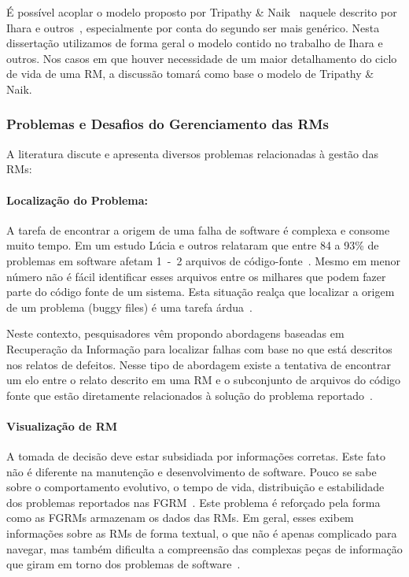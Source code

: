 É possível acoplar o modelo proposto por Tripathy \&
Naik~\cite{tripathy2014software} naquele descrito por Ihara e
outros~\cite{ihara2009analysis}, especialmente por conta do segundo ser mais
genérico.  Nesta dissertação utilizamos de forma geral o modelo contido no
trabalho de Ihara e outros. Nos casos em que houver necessidade de um maior
detalhamento do ciclo de vida de uma RM, a discussão tomará como base o modelo
de Tripathy \& Naik.
\todoend{}


\subsubsection{Problemas e Desafios do Gerenciamento das RMs}
\label{ssub:problemas_relacionadas_rm}

A literatura discute e apresenta diversos problemas relacionadas à gestão das
RMs:

\paragraph{Localização do Problema:} A tarefa de encontrar a origem de uma falha
de software é complexa e consome muito tempo. Em um estudo Lúcia e outros
relataram que entre 84 a 93\% de problemas em software afetam 1~-~2 arquivos de
código-fonte~\cite{thung2012faults}. Mesmo em menor número não é fácil identificar esses
arquivos entre os milhares que podem fazer parte do código fonte de um sistema. Esta situação
realça que localizar a origem de um problema (buggy files) é uma tarefa
árdua~\cite{Thung:2014:BIT:2635868.2661678}.

Neste contexto, pesquisadores vêm propondo abordagens baseadas em Recuperação da
Informação para localizar falhas com base no que está descritos nos relatos de
defeitos. Nesse tipo de abordagem existe a tentativa de encontrar um elo entre o
relato descrito em uma RM e o subconjunto de arquivos do código fonte que estão
diretamente relacionados à solução do problema
reportado~\cite{Wong:2014:BBF:2705615.2706096}.

\paragraph{Visualização de RM} A tomada de decisão deve estar subsidiada por
informações corretas. Este fato não é diferente na manutenção e desenvolvimento
de software. Pouco se sabe sobre o comportamento evolutivo, o tempo de vida,
distribuição e estabilidade dos problemas reportados nas
FGRM~\cite{hora2012bug}. Este problema é reforçado pela forma como as FGRMs
armazenam os dados das RMs. Em geral, esses exibem informações sobre as RMs de
forma textual, o que não é apenas complicado para navegar, mas também dificulta
a compreensão das complexas peças de informação que giram em torno dos problemas
de software~\cite{dal2014bug}.

